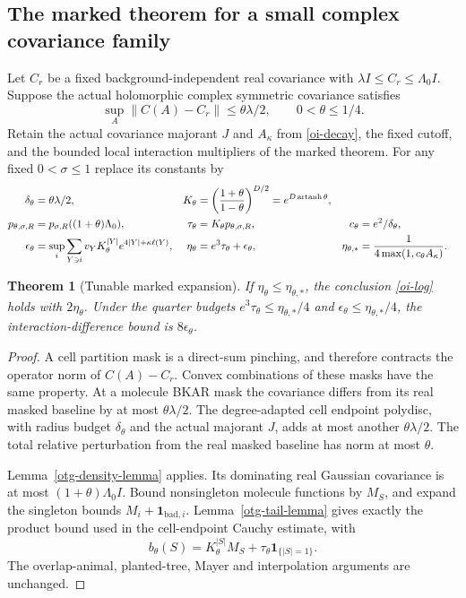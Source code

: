 \documentclass[11pt]{article}
\newtheorem{theorem}{Theorem}[section]
\theoremstyle{remark}
\begin{document}
\subsection{The marked theorem for a small complex covariance family}

Let $C_r$ be a fixed background-independent real covariance with
$\lambda I\le C_r\le\Lambda_0 I$. Suppose the actual holomorphic
complex symmetric covariance satisfies
\begin{equation}\label{otg-close}
 \sup_A\|C(A)-C_r\|\le\theta\lambda/2,\qquad
                                  0<\theta\le1/4.
\end{equation}
Retain the actual covariance majorant $J$ and $A_\kappa$
from \eqref{oi-decay}, the fixed cutoff, and the bounded local
interaction multipliers of the marked theorem.
For any fixed $0<\sigma\le1$ replace its constants by
\begin{align}
 \delta_\theta&=\theta\lambda/2,&
 K_\theta&=\left(\frac{1+\theta}{1-\theta}\right)^{D/2}
                     =e^{D\operatorname{artanh}\theta},\notag\\
 p_{\theta,\sigma,R}
       &=p_{\sigma,R}((1+\theta)\Lambda_0),&
 \tau_\theta&=K_\theta p_{\theta,\sigma,R},&
 c_\theta&=e^2/\delta_\theta,\notag\\
 \epsilon_\theta&=\sup_i\sum_{Y\ni i}
       v_YK_\theta^{|Y|}e^{4|Y|+\kappa\ell(Y)},&
 \eta_\theta&=e^3\tau_\theta+\epsilon_\theta,&
 \eta_{\theta,*}&=\frac1{4\max(1,c_\theta A_\kappa)}.
                                                        \label{otg-mark-constants}
\end{align}

\begin{theorem}[Tunable marked expansion]\label{otg-mark-theorem}
If $\eta_\theta\le\eta_{\theta,*}$, the conclusion
\eqref{oi-log} holds with $2\eta_\theta$.
Under the quarter budgets
$e^3\tau_\theta\le\eta_{\theta,*}/4$ and
$\epsilon_\theta\le\eta_{\theta,*}/4$,
the interaction-difference bound is $8\epsilon_\theta$.
\end{theorem}
\begin{proof}
A cell partition mask is a direct-sum pinching, and therefore
contracts the operator norm of $C(A)-C_r$. Convex combinations
of these masks have the same property. At a molecule BKAR
mask the covariance differs from its real masked baseline by
at most $\theta\lambda/2$. The degree-adapted cell endpoint
polydisc, with radius budget $\delta_\theta$ and the actual
majorant $J$, adds at most another $\theta\lambda/2$.
The total relative perturbation from the real masked baseline
has norm at most $\theta$.

Lemma~\ref{otg-density-lemma} applies. Its dominating real
Gaussian covariance is at most $(1+\theta)\Lambda_0I$.
Bound nonsingleton molecule functions by $M_S$, and expand
the singleton bounds $M_i+\mathbf1_{\mathrm{bad},i}$.
Lemma~\ref{otg-tail-lemma} gives exactly the product bound
used in the cell-endpoint Cauchy estimate, with
\[
 b_\theta(S)=K_\theta^{|S|}M_S+
                      \tau_\theta\mathbf1_{\{|S|=1\}}.
\]
The overlap-animal, planted-tree, Mayer and interpolation
arguments are unchanged.
\end{proof}
\end{document}
